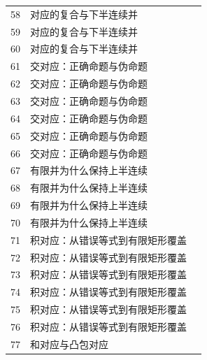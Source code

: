 \documentclass[11pt,a4paper]{article}
\theoremstyle{definition}\newtheorem{definition}{定义}\newtheorem{example}{例}
\begin{document}
\begin{longtable}{r p{.66\linewidth} r}
58 & 对应的复合与下半连续并 & \pageref{g:108:55}\\

59 & 对应的复合与下半连续并 & \pageref{g:108:55}\\

60 & 对应的复合与下半连续并 & \pageref{g:108:55}\\

61 & 交对应：正确命题与伪命题 & \pageref{g:108:61}\\

62 & 交对应：正确命题与伪命题 & \pageref{g:108:61}\\

63 & 交对应：正确命题与伪命题 & \pageref{g:108:61}\\

64 & 交对应：正确命题与伪命题 & \pageref{g:108:61}\\

65 & 交对应：正确命题与伪命题 & \pageref{g:108:61}\\

66 & 交对应：正确命题与伪命题 & \pageref{g:108:61}\\

67 & 有限并为什么保持上半连续 & \pageref{g:108:67}\\

68 & 有限并为什么保持上半连续 & \pageref{g:108:67}\\

69 & 有限并为什么保持上半连续 & \pageref{g:108:67}\\

70 & 有限并为什么保持上半连续 & \pageref{g:108:67}\\

71 & 积对应：从错误等式到有限矩形覆盖 & \pageref{g:108:71}\\

72 & 积对应：从错误等式到有限矩形覆盖 & \pageref{g:108:71}\\

73 & 积对应：从错误等式到有限矩形覆盖 & \pageref{g:108:71}\\

74 & 积对应：从错误等式到有限矩形覆盖 & \pageref{g:108:71}\\

75 & 积对应：从错误等式到有限矩形覆盖 & \pageref{g:108:71}\\

76 & 积对应：从错误等式到有限矩形覆盖 & \pageref{g:108:71}\\

77 & 和对应与凸包对应 & \pageref{g:108:77}\\


\end{longtable}
\end{document}
